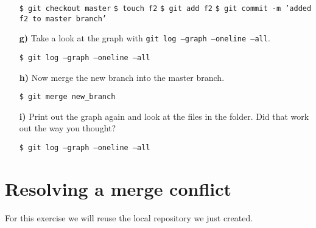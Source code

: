 \documentclass[11pt]{article}
\begin{document}
\begin{itemize}
\begin{framed}
\texttt{\$ git checkout master} \newline
\texttt{\$ touch f2} \newline
\texttt{\$ git add f2} \newline
\texttt{\$ git commit -m 'added f2 to master branch'}
\end{framed}
\item[\bf{g)}] Take a look at the graph with \texttt{git log --graph --oneline --all}.
\begin{framed}
\texttt{\$ git log --graph --oneline --all}
\end{framed}
\item[\bf{h)}] Now merge the new branch into the master branch.
\begin{framed}
\texttt{\$ git merge new\_branch}
\end{framed}
\item[\bf{i)}] Print out the graph again and look at the files in the folder. Did that work out the way you thought?
\begin{framed}
\texttt{\$ git log --graph --oneline --all}
\end{framed}
\end{itemize}

\section*{Resolving a merge conflict}
For this exercise we will reuse the local repository we just created.
\end{document}

